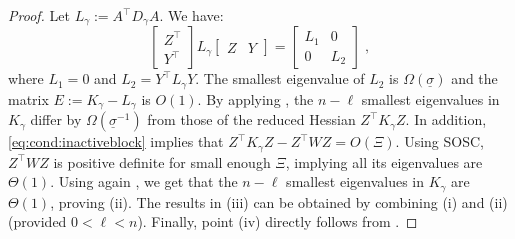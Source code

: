 \documentclass[smallextended]{svjour3}
\begin{document}
\begin{proof}
  Let $L_\gamma := A^\top D_\gamma A$.
  We have:
  \begin{equation}
    \begin{bmatrix}
      Z^\top \\ Y^\top
    \end{bmatrix}
    L_\gamma \begin{bmatrix}Z & Y \end{bmatrix}
    = \begin{bmatrix}
      L_1 & 0 \\
      0 & L_2
    \end{bmatrix} \; ,
  \end{equation}
  where $L_1 = 0$ and $L_2 = Y^\top L_\gamma Y$.
  The smallest eigenvalue of $L_2$ is $\Omega(\underline{\sigma})$
  and the matrix $E := K_\gamma - L_\gamma$ is $O(1)$.
  By applying \cite[Theorem 3.1, (ii)]{wright1998ill},
  the $n - \ell$ smallest eigenvalues in $K_\gamma$ differ by
  $\Omega(\underline{\sigma}^{-1})$ from those of the reduced Hessian $Z^\top K_\gamma Z$.
  In addition, \eqref{eq:cond:inactiveblock} implies
  that $Z^\top K_\gamma Z - Z^\top W Z = O(\Xi)$. Using SOSC,
  $Z^\top W Z$ is positive definite for small enough $\Xi$, implying
  all its eigenvalues are $\Theta(1)$. Using again \cite[Lemma 3.1]{wright1998ill},
  we get that the $n-\ell$ smallest eigenvalues in $K_\gamma$ are $\Theta(1)$,
  proving (ii). The results in (iii) can be obtained by combining
  (i) and (ii) (provided $0 < \ell < n$).
  Finally, point (iv) directly follows from \cite[Theorem 3.1 (i)]{wright1998ill}.
\end{proof}
\end{document}
